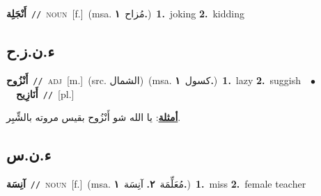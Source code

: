 \documentclass[10pt,a4paper,twoside]{article} %
\begin{document}
\begin{multicols}{2}
{\setlength\topsep{0pt}\textbf{\foreignlanguage{arabic}{أَنْجَلِة}}\ {\color{gray}\texttt{//}\color{black}}\ \textsc{noun}\ [f.]\ \color{gray}(msa. \foreignlanguage{arabic}{مُزاح}~\foreignlanguage{arabic}{\textbf{١.}})\color{black}\ \textbf{1.}~joking  \textbf{2.}~kidding\ } \vspace{2mm}

\vspace{-3mm}
\subsection*{\color{blue}\foreignlanguage{arabic}{ء.ن.ز.ح}\color{blue}{ (ntws)}} 

{\setlength\topsep{0pt}\textbf{\foreignlanguage{arabic}{أَنْزُوح}}\ {\color{gray}\texttt{//}\color{black}}\ \textsc{adj}\ [m.]\ (src. \color{gray}\foreignlanguage{arabic}{الشمال}\color{black})\ \color{gray}(msa. \foreignlanguage{arabic}{كسول}~\foreignlanguage{arabic}{\textbf{١.}})\color{black}\ \textbf{1.}~lazy  \textbf{2.}~suggish\ \ $\bullet$\ \ \setlength\topsep{0pt}\textbf{\foreignlanguage{arabic}{أَنَازِيح}}\ {\color{gray}\texttt{//}\color{black}}\ [pl.]\  \begin{flushright}\color{gray}\foreignlanguage{arabic}{\textbf{\underline{\foreignlanguage{arabic}{أمثلة}}}: يا الله شو أَنْزُوح بقيس مروته بالشِّبِر.}\end{flushright}\color{black}} \vspace{2mm}

\vspace{-3mm}
\subsection*{\color{blue}\foreignlanguage{arabic}{ء.ن.س}\color{blue}{}} 

{\setlength\topsep{0pt}\textbf{\foreignlanguage{arabic}{آنِسَة}}\ {\color{gray}\texttt{//}\color{black}}\ \textsc{noun}\ [f.]\ \color{gray}(msa. \foreignlanguage{arabic}{مُعَلِّمَة}~\foreignlanguage{arabic}{\textbf{٢.}}  \foreignlanguage{arabic}{آنِسَة}~\foreignlanguage{arabic}{\textbf{١.}})\color{black}\ \textbf{1.}~miss  \textbf{2.}~female teacher\ } \vspace{2mm}


\end{multicols}
\end{document}
